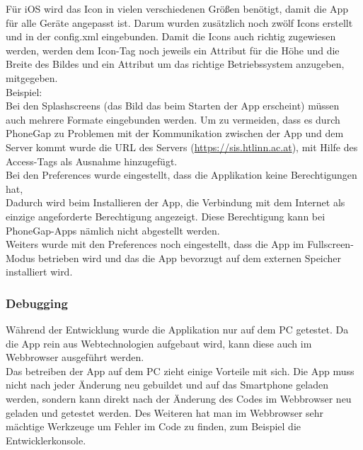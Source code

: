 Für iOS wird das Icon in vielen verschiedenen Größen benötigt, damit die App für alle Geräte angepasst ist. Darum wurden zusätzlich noch zwölf Icons erstellt und in der config.xml eingebunden. Damit die Icons auch richtig zugewiesen werden, werden dem Icon-Tag noch jeweils ein Attribut für die Höhe und die Breite des Bildes und ein Attribut um das richtige Betriebssystem anzugeben, mitgegeben.\\
Beispiel:\\


	

Bei den Splashscreens (das Bild das beim Starten der App erscheint) müssen auch mehrere Formate eingebunden werden.
Um zu vermeiden, dass es durch PhoneGap zu Problemen mit der Kommunikation zwischen der App und dem Server kommt wurde die URL des Servers (\href{https://sis.htlinn.ac.at}{https://sis.htlinn.ac.at}), mit Hilfe des Access-Tags als Ausnahme hinzugefügt.\\

Bei den Preferences wurde eingestellt, dass die Applikation keine Berechtigungen hat,\\



Dadurch wird beim Installieren der App, die Verbindung mit dem Internet als einzige angeforderte Berechtigung angezeigt. Diese Berechtigung kann bei PhoneGap-Apps nämlich nicht abgestellt werden.\\

Weiters wurde mit den Preferences noch eingestellt, dass die App im Fullscreen-Modus betrieben wird und das die App bevorzugt auf dem externen Speicher installiert wird.\\

\subsubsection{Debugging}
Während der Entwicklung wurde die Applikation nur auf dem PC getestet. Da die App rein aus Webtechnologien aufgebaut wird, kann diese auch im Webbrowser ausgeführt werden.\\
Das betreiben der App auf dem PC zieht einige Vorteile mit sich. Die App muss nicht nach jeder Änderung neu gebuildet und auf das Smartphone geladen werden, sondern kann direkt nach der Änderung des Codes im Webbrowser neu geladen und getestet werden. Des Weiteren hat man im Webbrowser sehr mächtige Werkzeuge um Fehler im Code zu finden, zum Beispiel die Entwicklerkonsole.\\


